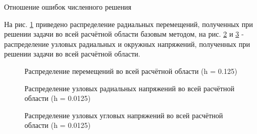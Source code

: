 \documentclass[a4paper, 14pt]{extarticle}
\newcommand{\area}{rectangle}
\newcommand{\task}{3_fixes}
\newcommand{\taskNum}{01}
\begin{document}
\begin{table}[h]
\caption{Отношение ошибок численного решения}
\label{table:task_\taskNum_basic_errors_rel}
\end{table}

\newpage

На рис. \ref{fig:task_\taskNum_basic_displacement_distribution} приведено распределение радиальных перемещений, полученных при решении задачи во всей расчётной области базовым методом, на рис. \ref{fig:task_\taskNum_basic_pressure_distribution_r} и \ref{fig:task_\taskNum_basic_pressure_distribution_phi} - распределение узловых радиальных и окружных напряжений, полученных при решении задачи во всей расчётной области.

\begin{figure}[h]
\caption{Распределение перемещений во всей расчётной области (h = 0.125)}
\label{fig:task_\taskNum_basic_displacement_distribution}
\end{figure}

\newpage

\begin{figure}[H]
\caption{Распределение узловых радиальных напряжений во всей расчётной области (h = 0.0125)}
\label{fig:task_\taskNum_basic_pressure_distribution_r}
\end{figure}
\begin{figure}[H]
\caption{Распределение узловых угловых напряжений во всей расчётной области (h = 0.0125)}
\label{fig:task_\taskNum_basic_pressure_distribution_phi}
\end{figure}
\end{document}
